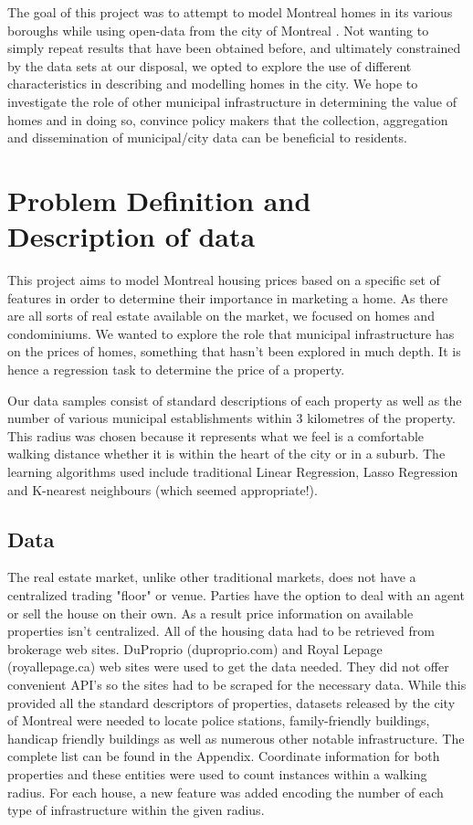 \documentclass{acm_proc_article-sp}
\begin{document}
	The goal of this project was to attempt to model Montreal homes in its various boroughs while using open-data from the city of Montreal \cite{data}. Not wanting to simply repeat results that have been obtained before, and ultimately constrained by the data sets at our disposal, we opted to explore the use of different characteristics in describing and modelling homes in the city. We hope to investigate the role of other municipal infrastructure in determining the value of homes and in doing so, convince policy makers that the collection, aggregation and dissemination of municipal/city data can be beneficial to residents.

\section{Problem Definition and Description of data} %
	
	This project aims to model Montreal housing prices based on a specific set of features in order to determine their importance in marketing a home. As there are all sorts of real estate available on the market, we focused on homes and condominiums. We wanted to explore the role that municipal infrastructure has on the prices of homes, something that hasn't been explored in much depth. It is hence a regression task to determine the price of a property.
	
	Our data samples consist of standard descriptions of each property as well as the number of various municipal establishments within 3 kilometres of the property. This radius was chosen because it represents what we feel is a comfortable walking distance whether it is within the heart of the city or in a suburb. The learning algorithms used include traditional Linear Regression, Lasso Regression and K-nearest neighbours (which seemed appropriate!). 

\subsection{Data} %

	The real estate market, unlike other traditional markets, does not have a centralized trading "floor" or venue. Parties have the option to deal with an agent or sell the house on their own. As a result price information on available properties isn't centralized. All of the housing data had to be retrieved from brokerage web sites. DuProprio (duproprio.com) and Royal Lepage  (royallepage.ca) web sites were used to get the data needed. They did not offer convenient API's so the sites had to be scraped for the necessary data. While this provided all the standard descriptors of properties, datasets released by the city of Montreal were needed to locate police stations, family-friendly buildings, handicap friendly buildings as well as numerous other notable infrastructure. The complete list can be found in the Appendix. Coordinate information for both properties and these entities were used to count instances within a walking radius. For each house, a new feature was added encoding the number of each type of infrastructure within the given radius.
	
\end{document}
